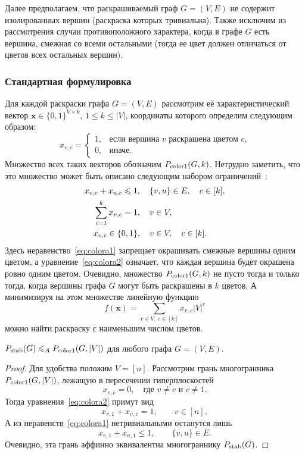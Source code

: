 Далее предполагаем, что раскрашиваемый граф $G=(V,E)$ не содержит изолированных вершин (раскраска которых тривиальна).
Также исключим из рассмотрения случаи противоположного характера, когда в графе $G$ есть вершина, смежная со всеми остальными (тогда ее цвет должен отличаться от цветов всех остальных вершин).




\subsubsection{Стандартная формулировка}

Для каждой раскраски графа $G=(V,E)$ рассмотрим её характеристический вектор $\bm{x} \in \{0,1\}^{V\times k}$, $1 \le k \le |V|$, координаты которого определим следующим образом:
\[
x_{v,c} = \begin{cases}
1, & \text{если вершина $v$ раскрашена цветом $c$,}\\
0, & \text{иначе.}
\end{cases}
\]
Множество всех таких векторов обозначим $\ColorA(G,k)$.
Нетрудно заметить, что это множество может быть описано следующим набором ограничений~\cite{Mehrotra:1996,Delle:2016}:
\begin{align}
x_{v,c} + x_{u,c} \le 1&, \quad \{v,u\} \in E, \quad c\in[k], \label{eq:colora1}\\
\sum_{c=1}^k x_{v,c} = 1&, \quad v\in V, \label{eq:colora2}\\
x_{v,c} \in \{0,1\}&, \quad v\in V, \quad c\in[k]. \notag
\end{align}
Здесь неравенство~\eqref{eq:colora1} запрещает окрашивать смежные вершины одним цветом,
а уравнение~\eqref{eq:colora2} означает, что каждая вершина будет окрашена ровно одним цветом.
Очевидно, множество $\ColorA(G,k)$ не пусто тогда и только тогда, когда вершины графа $G$ могут быть раскрашены в $k$ цветов.
А минимизируя на этом множестве линейную функцию 
\[
f(\bm{x}) = \sum_{v\in V, \ c\in[k]} x_{v,c} |V|^c
\]
можно найти раскраску с наименьшим числом цветов.

\begin{prop}\label{prop:ColorA}
	$\Stable(G) \lea \ColorA(G,|V|)$ для любого графа $G=(V,E)$.
\end{prop}
\begin{proof}
	Для удобства положим $V = [n]$.
	Рассмотрим грань многогранника $\ColorA(G,|V|)$, лежащую в пересечении гиперплоскостей
	\[
	x_{v,c} = 0, \quad \text{где $v \ne c$ и $c \ne 1$.} 
	\]
	Тогда уравнения~\eqref{eq:colora2} примут вид
	\[
	x_{v,1} + x_{v,v} = 1, \qquad v\in [n],
	\]
	А из неравенств~\eqref{eq:colora1} нетривиальными останутся лишь
	\[
	x_{v,1} + x_{u,1} \le 1, \qquad \{v,u\} \in E.
	\]
	Очевидно, эта грань аффинно эквивалентна многограннику $\Stable(G)$.
\end{proof}

